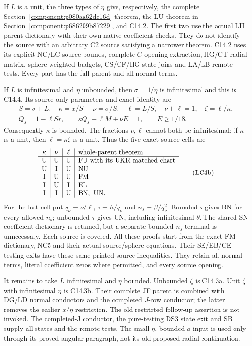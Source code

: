 If \(L\) is a unit, the three types of \(\eta\) give,
respectively, the complete Section~\ref{component:p080aa62de16d}
theorem, the LU theorem in Section~\ref{component:p686209b87229},
and C14.2.  The first two use the actual LII parent
dictionary with their own native coefficient checks.
They do not identify the source with an arbitrary C2
source satisfying a narrower theorem.
C14.2 uses its explicit NC/LC source bounds,
complete \(C\)-opening extraction, HG/CT radial matrix,
sphere-weighted budgets, CS/CF/HG state joins and LA/LB
remote tests.  Every part has the full parent and all
normal terms.

If \(L\) is infinitesimal and \(\eta\) unbounded, then
\(\sigma=1/\eta\) is infinitesimal and this is C14.4.
Its source-only parameters and exact identity are
\[
\begin{gathered}
 S=\sigma+L,\quad \kappa=x/S,\quad
 \nu=\sigma/S,\quad \ell=L/S,\quad \nu+\ell=1,\quad
 \zeta=\ell/\kappa,\\
 Q_s=1-\ell Sr,\qquad
 \kappa Q_s+\ell M+\nu E=1,\qquad E\geq1/18.
\end{gathered}\tag{LC4a}
\]
Consequently \(\kappa\) is bounded.  The fractions
\(\nu,\ell\) cannot both be infinitesimal; if \(\kappa\)
is a unit, then \(\ell=\kappa\zeta\) is a unit.
Thus the five exact source cells are
\[
\begin{array}{c|c|c|l}
\kappa&\nu&\ell&\text{whole-parent theorem}\\ \hline
{\rm U}&{\rm U}&{\rm U}&{\rm FU}\text{ with its UKR matched chart}\\
{\rm U}&{\rm I}&{\rm U}&{\rm NU}\\
{\rm I}&{\rm U}&{\rm U}&{\rm FM}\\
{\rm I}&{\rm U}&{\rm I}&{\rm EL}\\
{\rm I}&{\rm I}&{\rm U}&{\rm BN,\ UN}.
\end{array}\tag{LC4b}
\]
For the last cell put \(q_\nu=\nu/\ell\),
\(\tau=h/q_\nu\) and \(n_s=\beta/q_\nu^2\).
Bounded \(\tau\) gives BN for every allowed \(n_s\);
unbounded \(\tau\) gives UN, including infinitesimal
\(\theta\). The shared SN coefficient dictionary is retained,
but a separate bounded-\(n_s\) terminal is unnecessary. Each source is covered.
All these proofs start from the exact FM dictionary,
NC5 and their actual source/sphere equations.
Their SE/EB/CE testing exits have those same printed
source inequalities.  They retain all normal terms,
literal coefficient zeros where permitted, and every
source opening.

It remains to take \(L\) infinitesimal and \(\eta\)
bounded.  Unbounded \(\zeta\) is C14.3a.
Unit \(\zeta\) with infinitesimal \(\eta\) is C14.3b.
Their complete JF parent is combined with DG/LD normal
conductors and the completed \(J\)-row conductor;
the latter removes the earlier \(x/\eta\) restriction.
The old restricted follow-up assertion is not invoked.
The completed-J conductor, the pure-testing DS3 state exit and SB supply all states and the remote tests.
The small-\(\eta\), bounded-\(a\) input is used only
through its proved angular paragraph, not its old
proposed radial continuation.

